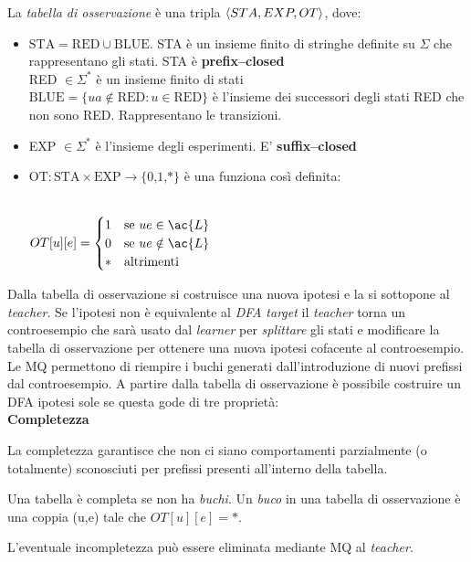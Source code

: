\begin{definizione*} La \textit{tabella di osservazione} è una tripla $\Braket{STA, EXP, OT}$, dove:
\begin{itemize}
\item $\text{STA}=\text{RED} \cup \text{BLUE}$.  STA è un insieme finito di stringhe definite su $\Sigma$ che rappresentano gli stati. STA è \textbf{prefix--closed}\\
RED $\in \Sigma^{*}$ è un insieme finito di stati\\
$\text{BLUE} = \{ua \notin \text{RED} : u \in \text{RED}\}$ è l'insieme dei successori degli stati RED che non sono RED. Rappresentano le transizioni.
\item EXP $\in \Sigma^{*}$  è l'insieme degli esperimenti. E' \textbf{suffix--closed}
\item $\text{OT} : \text{STA} \times \text{EXP} \to \text{\{0,1,*\}}$ è una funziona così definita:\\\\
\centerline{$
OT[u][e] = 
\begin{cases}
1
& \text{se $ue \in \ac{L}$} \\
0 & \text{se $ue \notin \ac{L}$}\\
* & \text{altrimenti}
\end{cases}
$}   
\end{itemize}
\end{definizione*} 
Dalla tabella di osservazione si costruisce una nuova ipotesi e la si sottopone al \textit{teacher}. Se l'ipotesi non è equivalente al \textit{DFA target} il \textit{teacher} torna un controesempio che sarà usato dal \textit{learner} per \textit{splittare} gli stati e modificare la tabella di osservazione per ottenere una nuova ipotesi cofacente al controesempio. Le \ac{MQ} permettono di riempire i buchi generati dall'introduzione di nuovi prefissi dal controesempio.  A partire dalla tabella di osservazione è possibile costruire un DFA ipotesi sole se questa gode di tre proprietà:\\

{\large\textbf{Completezza}}

La completezza garantisce che non ci siano comportamenti parzialmente (o totalmente) sconosciuti per prefissi presenti all'interno della tabella.
\begin{definizione*} Una tabella è completa se non ha \textit{buchi}. Un \textit{buco} in una tabella di osservazione è una coppia (u,e) tale che $OT[u][e] = *$.
\end{definizione*}
L'eventuale incompletezza può essere eliminata mediante \ac{MQ} al \textit{teacher}.\\

